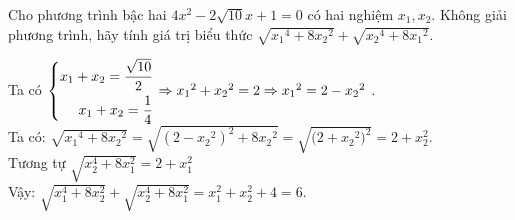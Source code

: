 \begin{ex}%
    Cho phương trình bậc hai $4x^2-2\sqrt{10}x+1=0$ có hai nghiệm $x_1,x_2$. Không giải phương trình, hãy tính giá trị biểu thức $\sqrt{{x_1}^4+8{x_2}^2}+\sqrt{{x_2}^4+8{x_1}^2}$.

\loigiai
    {
   Ta có $\left\{\begin{aligned}
   x_1+x_2=\dfrac{\sqrt{10}}{2}  \\
   x_1+x_2=\dfrac{1}{4}\end{aligned}\right.
\Rightarrow {x_1}^2+{x_2}^2=2\Rightarrow {x_1}^2=2-{x_2}^2$ .\\
 Ta có: $\sqrt{{x_1}^4+8{x_2}^2}=\sqrt{( 2-{x_2}^2)^2+8{x_2}^2}=\sqrt{{( 2+{x_2}^2})^2}=2+x_2^2$.\\
 Tương tự $\sqrt{x_2^4+8x_1^2}=2+x_1^2$\\
 Vậy:
$\sqrt{x_1^4+8x_2^2}+\sqrt{x_2^4+8x_1^2}=x_1^2+x_2^2+4=6$.
   }
\end{ex}
